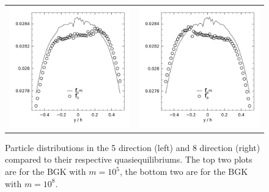 \begin{figure}
\begin{tabulary}{\linewidth}{c c}
\\
\includegraphics[width=\figwid]{figs/poise-bingham/bgk-8/feq-vs-f_5.png}
&
\includegraphics[width=\figwid]{figs/poise-bingham/bgk-8/feq-vs-f_8.png}
\end{tabulary}
\caption{Particle distributions in the 5 direction (left) and 8 direction (right) compared to their respective quasiequilibriums. The top two plots are for the BGK with $m = 10^5$, the bottom two are for the BGK with $m = 10^8$.}
\label{fig:feq-vs-f_bgk}
\end{figure}

